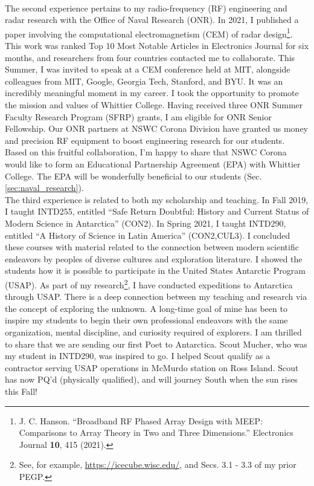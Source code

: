 \documentclass[../../main.tex]{subfiles}
\begin{document}
\\
\vspace{0.25cm}
The second experience pertains to my radio-frequency (RF) engineering and radar research with the Office of Naval Research (ONR).  In 2021, I published a paper involving the computational electromagnetism (CEM) of radar design\footnote{J. C. Hanson.  ``Broadband RF Phased Array Design with MEEP: Comparisons to Array Theory in Two and Three Dimensions.'' Electronics Journal \textbf{10}, 415 (2021).}.  This work was ranked Top 10 Most Notable Articles in Electronics Journal for six months, and researchers from four countries contacted me to collaborate.  This Summer, I was invited to speak at a CEM conference held at MIT, alongside colleagues from MIT, Google, Georgia Tech, Stanford, and BYU.  It was an incredibly meaningful moment in my career.  I took the opportunity to promote the mission and values of Whittier College.  Having received three ONR Summer Faculty Research Program (SFRP) grants, I am eligible for ONR Senior Fellowship.  Our ONR partners at NSWC Corona Division have granted us money and precision RF equipment to boost engineering research for our students.  Based on this fruitful collaboration, I'm happy to share that NSWC Corona would like to form an Educational Partnership Agreement (EPA) with Whittier College.  The EPA will be wonderfully beneficial to our students (Sec. \ref{sec:naval_research}).
\\
\vspace{0.25cm}
The third experience is related to both my scholarship and teaching.  In Fall 2019, I taught INTD255, entitled ``Safe Return Doubtful: History and Current Status of Modern Science in Antarctica'' (CON2).  In Spring 2021, I taught INTD290, entitled ``A History of Science in Latin America'' (CON2,CUL3).  I concluded these courses with material related to the connection between modern scientific endeavors by peoples of diverse cultures and exploration literature.  I showed the students how it is possible to participate in the United States Antarctic Program (USAP).  As part of my research\footnote{See, for example, \url{https://icecube.wisc.edu/}, and Secs. 3.1 - 3.3 of my prior PEGP.}, I have conducted expeditions to Antarctica through USAP.  There is a deep connection between my teaching and research via the concept of exploring the unknown.  A long-time goal of mine has been to inspire my students to begin their own professional endeavors with the same organization, mental discipline, and curiosity required of explorers.  I am thrilled to share that we are sending our first Poet to Antarctica.  Scout Mucher, who was my student in INTD290, was inspired to go.  I helped Scout qualify as a contractor serving USAP operations in McMurdo station on Ross Island.  Scout has now PQ'd (physically qualified), and will journey South when the sun rises this Fall!
\end{document}
